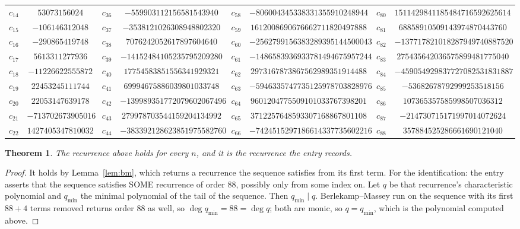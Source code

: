 \documentclass[11pt,a4paper]{article}
\theoremstyle{plain}
\newtheorem{theorem}{Theorem}
\theoremstyle{definition}
\begin{document}
\begin{center}
\begin{tabular}{cccccccc}
$c_{14}$ & $53073156024$ & $c_{36}$ & $-559903112156581543940$ & $c_{58}$ & $-806004345338331355910248944$ & $c_{80}$ & $15114298411854847165926256140$ \\
$c_{15}$ & $-106146312048$ & $c_{37}$ & $-3538121026308948802320$ & $c_{59}$ & $1612008690676662711820497888$ & $c_{81}$ & $68858910509143974870443760$ \\
$c_{16}$ & $-290865419748$ & $c_{38}$ & $7076242052617897604640$ & $c_{60}$ & $-2562799156383289395144500043$ & $c_{82}$ & $-137717821018287949740887520$ \\
$c_{17}$ & $5613311277936$ & $c_{39}$ & $-14152484105235795209280$ & $c_{61}$ & $-1486583936933781494675957244$ & $c_{83}$ & $275435642036575899481775040$ \\
$c_{18}$ & $-11226622555872$ & $c_{40}$ & $17754583851556341929321$ & $c_{62}$ & $2973167873867562989351914488$ & $c_{84}$ & $-459054929837727082531831887$ \\
$c_{19}$ & $22453245111744$ & $c_{41}$ & $69994675886039801033748$ & $c_{63}$ & $-5946335747735125978703828976$ & $c_{85}$ & $-53682678792999253518156$ \\
$c_{20}$ & $22053147639178$ & $c_{42}$ & $-139989351772079602067496$ & $c_{64}$ & $9601204775509101033767398201$ & $c_{86}$ & $107365357585998507036312$ \\
$c_{21}$ & $-713702673905016$ & $c_{43}$ & $279978703544159204134992$ & $c_{65}$ & $3712257648593307168867801108$ & $c_{87}$ & $-214730715171997014072624$ \\
$c_{22}$ & $1427405347810032$ & $c_{44}$ & $-383392128623851975582760$ & $c_{66}$ & $-7424515297186614337735602216$ & $c_{88}$ & $357884525286661690121040$ \\
\end{tabular}
\end{center}

\begin{theorem}
The recurrence above holds for every $n$, and it is the recurrence the entry records.
\end{theorem}

\begin{proof}
It holds by Lemma~\ref{lem:bm}, which returns a recurrence the sequence satisfies from its
first term. For the identification: the entry asserts that the sequence satisfies SOME
recurrence of order $88$, possibly only from some index on. Let $q$ be that recurrence's
characteristic polynomial and $q_{\min}$ the minimal polynomial of the tail of the sequence.
Then $q_{\min}\mid q$. Berlekamp--Massey run on the sequence with its first $88+4$ terms
removed returns order $88$ as well, so $\deg q_{\min}=88=\deg q$; both are monic, so
$q=q_{\min}$, which is the polynomial computed above.
\end{proof}
\end{document}
